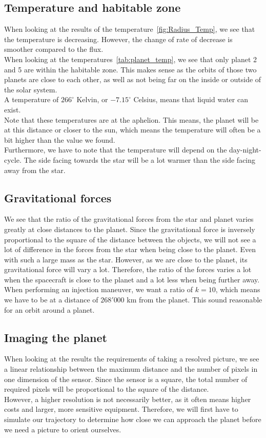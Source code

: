 \documentclass[reprint,english,notitlepage]{revtex4-2}
\begin{document}
\subsection{Temperature and habitable zone}\label{subsec:disc_temperature}
	When looking at the results of the temperature~\ref{fig:Radius_Temp}, we see that the temperature is decreasing.
	However, the change of rate of decrease is smoother compared to the flux.\\
	When looking at the temperatures~\ref{tab:planet_temp}, we see that only planet 2 and 5 are within the habitable zone.
	This makes sense as the orbits of those two planets are close to each other, as well as not being far on the inside or outside of the solar system.\\
	A temperature of $266^{\circ}$ Kelvin, or $-7.15^{\circ}$ Celsius, means that liquid water can exist.\\
	Note that these temperatures are at the aphelion.
	This means, the planet will be at this distance or closer to the sun, which means the temperature will often be a bit higher than the value we found.\\
	Furthermore, we have to note that the temperature will depend on the day-night-cycle.
	The side facing towards the star will be a lot warmer than the side facing away from the star.

\subsection{Gravitational forces}\label{subsec:disc_gravitational-forces}
	We see that the ratio of the gravitational forces from the star and planet varies greatly at close distances to the planet.
	Since the gravitational force is inversely proportional to the square of the distance between the objects, we will not see a lot of difference in the forces from the star when being close to the planet.
	Even with such a large mass as the star.
	However, as we are close to the planet, its gravitational force will vary a lot.
	Therefore, the ratio of the forces varies a lot when the spacecraft is close to the planet and a lot less when being further away.
	When performing an injection maneuver, we want a ratio of $k = 10$, which means we have to be at a distance of $268'000$ km from the planet.
	This sound reasonable for an orbit around a planet.

\subsection{Imaging the planet}\label{subsec:disc_imaging-the-planet}
	When looking at the results the requirements of taking a resolved picture, we see a linear relationship between the maximum distance and the number of pixels in one dimension of the sensor.
	Since the sensor is a square, the total number of required pixels will be proportional to the square of the distance.\\
	However, a higher resolution is not necessarily better, as it often means higher costs and larger, more sensitive equipment.
	Therefore, we will first have to simulate our trajectory to determine how close we can approach the planet before we need a picture to orient ourselves.
\end{document}

